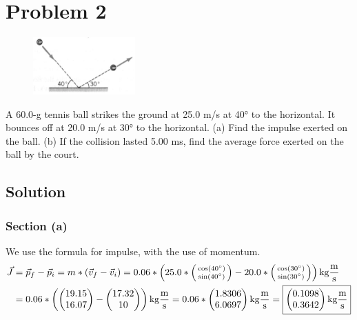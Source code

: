 \documentclass[12pt]{article}
\begin{document}
\pagebreak
\section*{Problem 2}
\begin{figure}
    \vspace{-30pt}
    \includegraphics[width=0.35\textwidth]{graph_2.png} 
\end{figure}
A 60.0-g tennis ball strikes the ground at 25.0 m/s at 40\unit{\degree} to the horizontal. It bounces off at 20.0 m/s at 30\unit{\degree} to the horizontal. (a) Find the impulse exerted on the ball. (b) If the collision lasted 5.00 ms, find the average force exerted on the ball by the court.

\subsection*{Solution}
\subsubsection*{Section (a)}
We use the formula for impulse, with the use of momentum.
\begin{align*}
    \vec{J} &=  \vec{p}_f - \vec{p}_i
        =   m*(\vec{v}_f - \vec{v}_i)
        =   0.06*\left( 25.0*\left(\begin{smallmatrix} \cos(40\unit{\degree}) \\ \sin(40\unit{\degree}) \end{smallmatrix}\right) - 20.0*\left(\begin{smallmatrix} \cos(30\unit{\degree}) \\ \sin(30\unit{\degree}) \end{smallmatrix}\right) \right) \unit{\kilo\gram\frac{\meter}{\second}}\\
        &=  0.06*\left( \begin{pmatrix} 19.15 \\ 16.07 \end{pmatrix} - \begin{pmatrix} 17.32 \\ 10 \end{pmatrix} \right) \unit{\kilo\gram\frac{\meter}{\second}}
        =   0.06*\begin{pmatrix} 1.8306 \\ 6.0697 \end{pmatrix} \unit{\kilo\gram\frac{\meter}{\second}}
        =   \boxed{ \begin{pmatrix} 0.1098 \\ 0.3642 \end{pmatrix} \unit{\kilo\gram\frac{\meter}{\second}} }
\end{align*}
\end{document}
